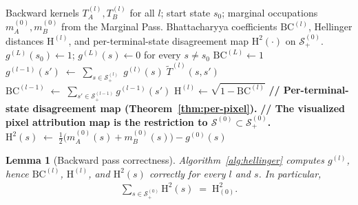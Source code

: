 \documentclass[twoside]{article}
\newcommand{\1}{\mathbf{1}}
\newtheorem{lemma}{Lemma}
\begin{document}
\begin{algorithm}[H]
    \caption{Hellinger backward pass (with per-terminal-state disagreement map)}
    \label{alg:hellinger}\label{alg:hellinger-backward}
    \begin{algorithmic}[1]
\Require Backward kernels $T^{(l)}_A, T^{(l)}_B$ for all $l$; start state $s_0$; marginal occupations $m^{(0)}_A, m^{(0)}_B$ from the Marginal Pass.
\Ensure Bhattacharyya coefficients $\mathrm{BC}^{(l)}$, Hellinger distances $\mathrm{H}^{(l)}$, and per-terminal-state disagreement map $\mathrm{H}^2(\cdot)$ on $\mathcal{S}^{(0)}_+$.
\State $g^{(L)}(s_0) \gets 1$; \quad $g^{(L)}(s) \gets 0$ for every $s \neq s_0$
\State $\mathrm{BC}^{(L)} \gets 1$
        \State $g^{(l-1)}(s') \;\gets\; \displaystyle\sum_{s \in \mathcal{S}^{(l)}_+}\; g^{(l)}(s)\; \widetilde{T}^{(l)}(s, s')$
    \EndFor
    \State $\mathrm{BC}^{(l-1)} \;\gets\; \displaystyle\sum_{s' \in \mathcal{S}^{(l-1)}_+} g^{(l-1)}(s')$
\EndFor
{}
    \State $\mathrm{H}^{(l)} \gets \sqrt{1 - \mathrm{BC}^{(l)}}$
\EndFor
\State \textbf{// Per-terminal-state disagreement map (Theorem~\ref{thm:per-pixel}).}
\State \textbf{// The visualized pixel attribution map is the restriction to $\mathcal{S}^{(0)} \subset \mathcal{S}^{(0)}_+$.}
    \State $\mathrm{H}^2(s) \;\gets\; \tfrac{1}{2}\bigl(m^{(0)}_A(s) + m^{(0)}_B(s)\bigr) - g^{(0)}(s)$
\EndFor
\end{algorithmic}
\end{algorithm}

\begin{lemma}[Backward pass correctness]\label{lem:hellinger-backward-correctness}
Algorithm~\ref{alg:hellinger} computes $g^{(l)}$, hence $\mathrm{BC}^{(l)}$, $\mathrm{H}^{(l)}$,
and $\mathrm{H}^2(s)$ correctly for every $l$ and $s$.  In particular,
\begin{align}
    \sum_{s \in \mathcal{S}^{(0)}_+} \mathrm{H}^2(s) \;=\; \mathrm{H}^{2}_{(0)}.
\end{align}
\end{lemma}
\end{document}
